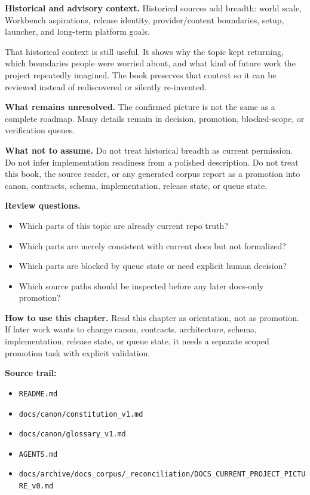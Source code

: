\documentclass[10.5pt,a4paper,openany]{book}
\begin{document}
\textbf{Historical and advisory context.} Historical sources add breadth: world scale, Workbench aspirations, release identity, provider/\allowbreak{}content boundaries, setup, launcher, and long-\allowbreak{}term platform goals.\allowbreak{}


That historical context is still useful.\allowbreak{} It shows why the topic kept returning, which boundaries people were worried about, and what kind of future work the project repeatedly imagined.\allowbreak{} The book preserves that context so it can be reviewed instead of rediscovered or silently re-\allowbreak{}invented.\allowbreak{}


\textbf{What remains unresolved.} The confirmed picture is not the same as a complete roadmap.\allowbreak{} Many details remain in decision, promotion, blocked-\allowbreak{}scope, or verification queues.\allowbreak{}


\textbf{What not to assume.} Do not treat historical breadth as current permission.\allowbreak{} Do not infer implementation readiness from a polished description.\allowbreak{} Do not treat this book, the source reader, or any generated corpus report as a promotion into canon, contracts, schema, implementation, release state, or queue state.\allowbreak{}


\textbf{Review questions.}


\begin{itemize}
\item Which parts of this topic are already current repo truth?
\item Which parts are merely consistent with current docs but not formalized?
\item Which parts are blocked by queue state or need explicit human decision?
\item Which source paths should be inspected before any later docs-\allowbreak{}only promotion?
\end{itemize}

\textbf{How to use this chapter.} Read this chapter as orientation, not as promotion.\allowbreak{} If later work wants to change canon, contracts, architecture, schema, implementation, release state, or queue state, it needs a separate scoped promotion task with explicit validation.\allowbreak{}


\textbf{Source trail:}


\begin{itemize}
\item \texttt{README.\allowbreak{}md}
\item \texttt{docs/\allowbreak{}canon/\allowbreak{}constitution\_\allowbreak{}v1.\allowbreak{}md}
\item \texttt{docs/\allowbreak{}canon/\allowbreak{}glossary\_\allowbreak{}v1.\allowbreak{}md}
\item \texttt{AGENTS.\allowbreak{}md}
\item \texttt{docs/\allowbreak{}archive/\allowbreak{}docs\_\allowbreak{}corpus/\allowbreak{}\_\allowbreak{}reconciliation/\allowbreak{}DOCS\_\allowbreak{}CURRENT\_\allowbreak{}PROJECT\_\allowbreak{}PICTURE\_\allowbreak{}v0.\allowbreak{}md}
\end{itemize}
\end{document}
